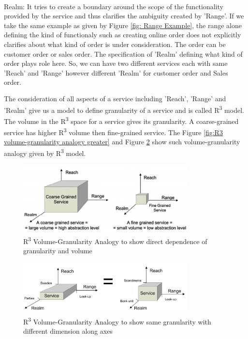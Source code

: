 \cite{Keen:2015aa, Weill:1998aa, Pierre-Reldin:2007aa}
\\
Realm: It tries to create a boundary around the scope of the functionality provided by the service and thus clarifies the ambiguity created by 'Range'. If we take the same example as given by Figure \ref{fig: Range Example}, the range alone defining the kind of functionaly such as creating online order does not explicitly clarifies about what kind of order is under consideration. The order can be customer order or sales order. The specification of 'Realm' defining what kind of order plays role here. So, we can have two different services each with same 'Reach' and 'Range' however different 'Realm' for customer order and Sales order.  \cite{Keen:2015aa, Weill:1998aa, Pierre-Reldin:2007aa}

The consideration of all aspects of a service including 'Reach', 'Range' and 'Realm' give us a model to define granularity of a service and is called R\textsuperscript{3} model. The volume in the R\textsuperscript{3} space for a service gives its granularity. A coarse-grained service has higher R\textsuperscript{3} volume then fine-grained service. The Figure \ref{fig:R3 volume-granularity analogy greater}  and Figure \ref{fig:R3 volume-granularity analogy equal} show such volume-granularity analogy given by R\textsuperscript{3} model. \cite{Keen:2015aa, Weill:1998aa, Pierre-Reldin:2007aa}

\begin{figure}[H]
\begin{center}
\includegraphics[width=0.8\textwidth]{figures/Granularity-R3-three}
\caption{R\textsuperscript{3} Volume-Granularity Analogy to show direct dependence of granularity and volume \cite{Pierre-Reldin:2007aa}}
\label{fig:R3 volume-granularity analogy greater }
\end{center}
\end{figure}

\begin{figure}[H]
\begin{center}
\includegraphics[width=0.8\textwidth]{figures/Granularity-R3-four}
\caption{R\textsuperscript{3} Volume-Granularity Analogy to show same granularity with different dimension along axes \cite{Pierre-Reldin:2007aa}}
\label{fig:R3 volume-granularity analogy equal}
\end{center}
\end{figure}


